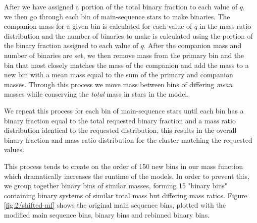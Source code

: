 After we have assigned a portion of the total binary fraction to each value of $q$, we then go
through each bin of main-sequence stars to make binaries. The companion mass for a given bin is
calculated for each value of $q$ in the mass ratio distribution and the number of binaries to make
is calculated using the portion of the binary fraction assigned to each value of $q$. After the
companion mass and number of binaries are set, we then remove mass from the primary bin and the bin
that most closely matches the mass of the companion and add the mass to a new bin with a mean mass
equal to the sum of the primary and companion masses. Through this process we move mass between bins
of differing \emph{mean} masses while conserving the \emph{total} mass in stars in the model.


We repeat this process for each bin of main-sequence stars until each bin has a binary fraction
equal to the total requested binary fraction and a mass ratio distribution identical to the
requested distribution, this results in the overall binary fraction and mass ratio distribution for
the cluster matching the requested values.


This process tends to create on the order of 150 new bins in our mass function which dramatically
increases the runtime of the  models. In order to prevent this, we group together
binary bins of similar masses, forming 15 "binary bins" containing binary systems of similar total
mass but differing mass ratios. Figure \ref{fig:2/shifted-mf} shows the original main sequence bins,
plotted with the modified main sequence bins, binary bins and rebinned binary bins.



